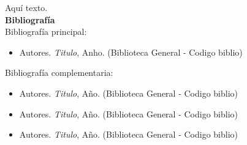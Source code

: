 \documentclass[letterpaper,10pt,onecolumn]{article}
\begin{document}

\noindent\normalsize Aqu\'i texto.\\[0.1cm]

\noindent\textbf{\large {} \quad Bibliograf\'ia}\\[-0.2cm]


\noindent\normalsize Bibliograf\'ia principal:

\begin{itemize}
	\item Autores. \textit{Titulo}, Anho. (Biblioteca General - Codigo biblio)
\end{itemize}

\noindent\normalsize Bibliograf\'ia complementaria:

\begin{itemize}
	\item Autores. \textit{Titulo}, A\~no. (Biblioteca General - Codigo biblio)\\[-0.6cm]
	\item Autores. \textit{Titulo}, A\~no. (Biblioteca General - Codigo biblio)\\[-0.6cm]
	\item Autores. \textit{Titulo}, A\~no. (Biblioteca General - Codigo biblio)
\end{itemize}
\end{document}

